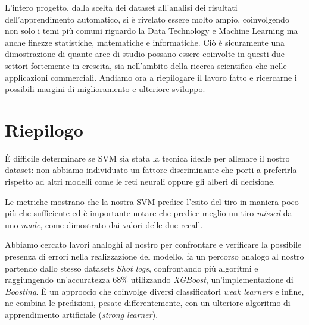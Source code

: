 L'intero progetto, dalla scelta dei dataset all'analisi dei risultati dell'apprendimento automatico, si è rivelato essere molto ampio, coinvolgendo non solo i temi più comuni riguardo la Data Technology e Machine Learning ma anche finezze statistiche, matematiche e informatiche. Ciò è sicuramente una dimostrazione di quante aree di studio possano essere coinvolte in questi due settori fortemente in crescita, sia nell'ambito della ricerca scientifica che nelle applicazioni commerciali.
Andiamo ora a riepilogare il lavoro fatto e ricercarne i possibili margini di miglioramento e ulteriore sviluppo.
\par

\section{Riepilogo}
È difficile determinare se SVM sia stata la tecnica ideale per allenare il nostro dataset: non abbiamo individuato un fattore discriminante che porti a preferirla rispetto ad altri modelli come le reti neurali oppure gli alberi di decisione.
\par
Le metriche mostrano che la nostra SVM predice l'esito del tiro in maniera poco più che sufficiente ed è importante notare che predice meglio un tiro \textit{missed} da uno \textit{made}, come dimostrato dai valori delle due recall.
\par
Abbiamo cercato lavori analoghi al nostro per confrontare e verificare la possibile presenza di errori nella realizzazione del modello. \cite{predictingNBAst} fa un percorso analogo al nostro partendo dallo stesso datasets \textit{Shot logs}, confrontando più algoritmi e raggiungendo un'accuratezza  68\% utilizzando \textit{XGBoost}, un'implementazione di \textit{Boosting}. È un approccio che coinvolge diversi classificatori \textit{weak learners} e infine, ne combina le predizioni, pesate differentemente, con un ulteriore algoritmo di apprendimento artificiale (\textit{strong learner}).


